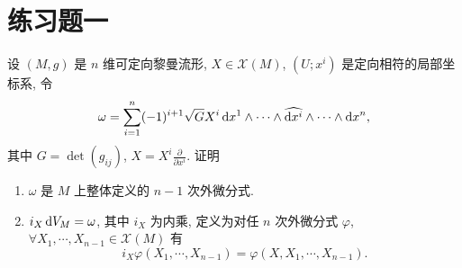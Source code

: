 \section{练习题一}



\begin{exercise}
  设 $(M,g)$ 是 $n$ 维可定向黎曼流形, $X\in\mathscr{X}(M)$, $(U;x^i)$
  是定向相符的局部坐标系, 令
  \[\omega=\sum_{i=1}^n (-1)^{i+1}\sqrt{G}X^i\mathop{}\!\mathrm{d} x^1\wedge\cdots\wedge\widehat{\mathop{}\!\mathrm{d} x^i}\wedge\cdots\wedge\mathop{}\!\mathrm{d} x^n,\]
  其中 $G=\det(g_{ij})$, $X=X^i\frac{\partial}{\partial x^i}$. 证明
  \begin{enumerate}[(1)]
    \item $\omega$ 是 $M$ 上整体定义的 $n-1$ 次外微分式.
    \item $i_X\mathop{}\!\mathrm{d} V_M=\omega$, 其中 $i_X$ 为内乘, 定义为对任 $n$ 次外微分式 $\varphi$,
      $\forall X_1,\cdots,X_{n-1}\in\mathscr{X}(M)$ 有
      \[i_X\varphi(X_1,\cdots,X_{n-1})=\varphi(X,X_1,\cdots,X_{n-1}).\]
  \end{enumerate}
\end{exercise}

